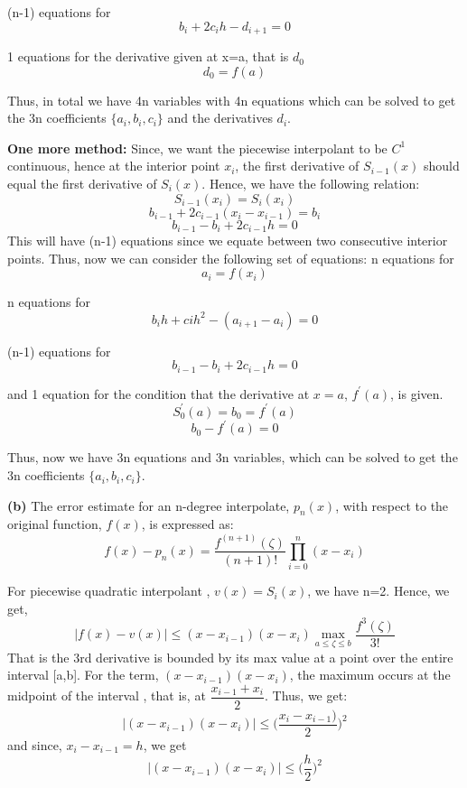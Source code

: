 \documentclass{article}
\renewcommand\part[1]{\vspace{.10in}\textbf{(#1)}}
\begin{document}
(n-1) equations for 
\[ b_i + 2c_i h - d_{i+1} = 0 \]

1 equations for the derivative given at x=a, that is $d_0$
\[ d_0 = f(a)\]

Thus, in total we have 4n variables with 4n equations which can be solved to get the 3n coefficients $\{a_i, b_i, c_i\}$ and the derivatives $d_i$. \newline

\textbf{One more method:} Since, we want the piecewise interpolant to be $C^1$ continuous, hence at the interior point $x_i$, the first derivative of $S_{i-1}(x)$ should equal the first derivative of $S_i(x)$. Hence, we have the following relation:
\[ S_{i-1}(x_i) = S_i(x_i)\]
\[ b_{i-1} + 2c_{i-1}(x_i - x_{i-1}) = b_i\]
\[ b_{i-1} - b_i + 2c_{i-1} h = 0\]
This will have (n-1) equations since we equate between two consecutive interior points. \newline
Thus, now we can consider the following set of equations: \newline
n equations for
\[ a_i = f(x_i)\]

n equations for
\[ b_i h + ci h^2 - (a_{i+1} - a_i) = 0\]

(n-1) equations for 
\[ b_{i-1} - b_i + 2c_{i-1} h = 0\]

and 1 equation for the condition that the derivative at $x=a$, $f^\prime(a)$, is given.
\[S_0^\prime(a) = b_0 = f^\prime(a) \]
\[ b_0 - f^\prime(a) = 0\]

Thus, now we have 3n equations and 3n variables, which can be solved to get the 3n coefficients $\{a_i, b_i, c_i\}$. \newline

 \part{b} The error estimate for an n-degree interpolate, $p_n(x)$, with respect to the original function, $f(x)$, is expressed as: 
 \[ f(x) - p_n(x) = \dfrac{f^{(n+1)}(\zeta)}{(n+1)!} \prod_{i=0}^n (x - x_i)\]

 For piecewise quadratic interpolant , $v(x) = S_i(x)$, we have n=2. Hence, we get,
 \begin{equation}
  |f(x) - v(x)| \leq (x - x_{i-1})(x - x_i) \max_{a \leq \zeta \leq b} \dfrac{f^3(\zeta)}{3!} 
  \label{eq:err}
 \end{equation}
 That is the 3rd derivative is bounded by its max value at a point over the entire interval [a,b]. 
 For the term, $(x-x_{i-1})(x - x_i)$, the maximum occurs at the midpoint of the interval , that is, at $\dfrac{x_{i-1} + x_i}{2}$. Thus, we get: \newline
 \[ |(x - x_{i-1})(x - x_i)| \leq \bigg ( \dfrac{x_i - x_{i-1})}{2} \bigg )^2 \]
 and since, $x_i - x_{i-1} = h$, we get
 \[ |(x - x_{i-1})(x - x_i)| \leq \bigg ( \dfrac{h}{2} \bigg )^2 \]
\end{document}
